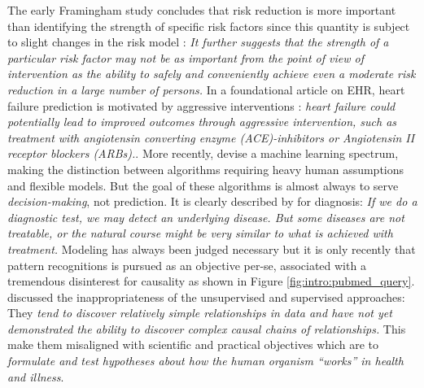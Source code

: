 \documentclass[french,12pt,twoside,a4paper]{book}
\begin{document}
\begin{background_box_left}
  The early Framingham study concludes that risk reduction is more important
  than identifying the strength of specific risk factors since this quantity is
  subject to slight changes in the risk model \citep{brand1976multivariate}:
  \textit{It further suggests that the strength of a particular risk factor may
    not be as important from the point of view of intervention as the ability to
    safely and conveniently achieve even a moderate risk reduction in a large
    number of persons.} In a foundational article on EHR, heart failure prediction
  is motivated by aggressive interventions \citep{wu2010prediction}:
  \textit{heart failure could potentially lead to improved outcomes through
    aggressive intervention, such as treatment with angiotensin converting enzyme
    (ACE)-inhibitors or Angiotensin II receptor blockers (ARBs).}. More recently,
  \cite{beam2018big} devise a machine learning spectrum, making the distinction
  between algorithms requiring heavy human assumptions and flexible models. But
  the goal of these algorithms is almost always to serve
  \textit{decision-making}, not prediction. It is clearly described by
  \cite{steyerberg2009applications} for diagnosis: \textit{If we do a diagnostic
    test, we may detect an underlying disease. But some diseases are not
    treatable, or the natural course might be very similar to what is achieved
    with treatment.} Modeling has always been judged necessary but it is only
  recently that pattern recognitions is pursued as an objective per-se,
  associated with a tremendous disinterest for causality as shown in Figure
  \ref{fig:intro:pubmed_query}. \cite{patel2009coming} discussed the
  inappropriateness of the unsupervised and supervised approaches: They
  \textit{tend to discover relatively simple relationships in data and have not
    yet demonstrated the ability to discover complex causal chains of
    relationships.} This make them misaligned with scientific and practical
  objectives which are to \textit{formulate and test hypotheses about how the
    human organism “works” in health and illness}.

\end{background_box_left}
\end{document}
